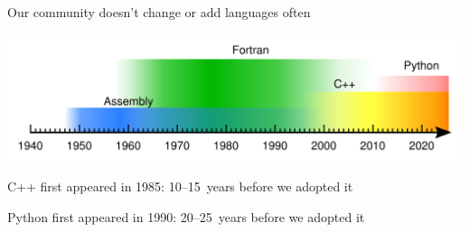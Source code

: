 \documentclass[aspectratio=169]{beamer}
\begin{document}
\begin{frame}{Our community doesn't change or add languages often}
\large
\vspace{0.25 cm}

\includegraphics[width=\linewidth]{img/programming-languages.pdf}

\vspace{0.5 cm}
C++ first appeared in 1985: 10--15~years before we adopted it

\vspace{0.25 cm}
Python first appeared in 1990: 20--25~years before we adopted it

\vspace{0.25 cm}
\end{frame}
\end{document}
